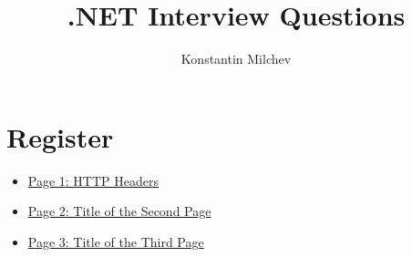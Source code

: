 \documentclass{book}
\title{.NET Interview Questions}
\author{Konstantin Milchev}
\date{}
\begin{document}
\maketitle

\clearpage

\tableofcontents

\chapter*{Register}

\begin{itemize}
    \item \hyperlink{page1}{Page 1: HTTP Headers}
    \item \hyperlink{page2}{Page 2: Title of the Second Page}
    \item \hyperlink{page3}{Page 3: Title of the Third Page}
\end{itemize}


\newpage

\end{document}
